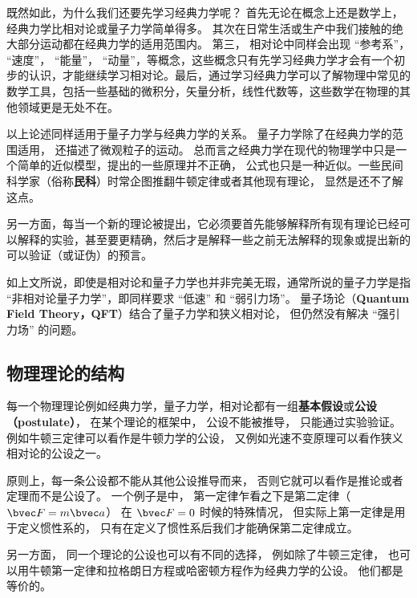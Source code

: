 既然如此，为什么我们还要先学习经典力学呢？ 首先无论在概念上还是数学上，经典力学比相对论或量子力学简单得多。 其次在日常生活或生产中我们接触的绝大部分运动都在经典力学的适用范围内。 第三， 相对论中同样会出现 “参考系”， “速度”， “能量”， “动量”，等概念，这些概念只有先学习经典力学才会有一个初步的认识，才能继续学习相对论。最后，通过学习经典力学可以了解物理中常见的数学工具，包括一些基础的微积分，矢量分析，线性代数等，这些数学在物理的其他领域更是无处不在。

以上论述同样适用于量子力学与经典力学的关系。 量子力学除了在经典力学的范围适用， 还描述了微观粒子的运动。 总而言之经典力学在现代的物理学中只是一个简单的近似模型，提出的一些原理并不正确， 公式也只是一种近似。一些民间科学家（俗称\textbf{民科}）时常企图推翻牛顿定律或者其他现有理论， 显然是还不了解这点。

另一方面，每当一个新的理论被提出，它必须要首先能够解释所有现有理论已经可以解释的实验，甚至要更精确，然后才是解释一些之前无法解释的现象或提出新的可以验证（或证伪）的预言。

如上文所说，即使是相对论和量子力学也并非完美无瑕，通常所说的量子力学是指 “非相对论量子力学”，即同样要求 “低速” 和 “弱引力场”。 量子场论（\textbf{Quantum Field Theory，QFT}）结合了量子力学和狭义相对论， 但仍然没有解决 “强引力场” 的问题。

\subsection{物理理论的结构}
每一个物理理论例如经典力学，量子力学，相对论都有一组\textbf{基本假设}或\textbf{公设（postulate）}， 在某个理论的框架中， 公设不能被推导， 只能通过实验验证。 例如牛顿三定律可以看作是牛顿力学的公设， 又例如光速不变原理可以看作狭义相对论的公设之一。

原则上，每一条公设都不能从其他公设推导而来， 否则它就可以看作是推论或者定理而不是公设了。 一个例子是中， 第一定律乍看之下是第二定律（$\bvec F = m\bvec a$） 在 $\bvec F = 0$ 时候的特殊情况， 但实际上第一定律是用于定义惯性系的， 只有在定义了惯性系后我们才能确保第二定律成立。

另一方面， 同一个理论的公设也可以有不同的选择， 例如除了牛顿三定律， 也可以用牛顿第一定律和拉格朗日方程或哈密顿方程作为经典力学的公设。 他们都是等价的。


